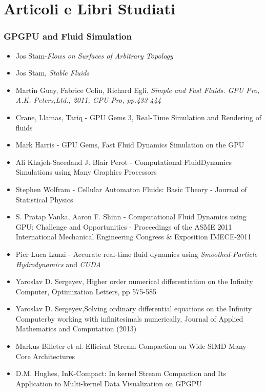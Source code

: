 \section{Articoli e Libri Studiati}
\subsubsection{GPGPU and Fluid Simulation}
\begin{itemize}
	\item  Jos Stam-\textit{Flows on Surfaces of Arbitrary Topology}
	\item Jos Stam, \textit{Stable Fluids}
	\item Martin Guay, Fabrice Colin, Richard Egli. \textit{Simple and Fast
		Fluids. GPU Pro, A.K. Peters,Ltd., 2011, GPU Pro, pp.433-444}
	\item Crane, Llamas, Tariq - GPU Gems 3, Real-Time Simulation and Rendering
	of fluids
	\item Mark Harris - GPU Gems,  Fast Fluid Dynamics Simulation on the GPU
	\item Ali Khajeh-Saeedand J. Blair Perot - Computational FluidDynamics
	Simulations using Many Graphics Processors
	\item Stephen Wolfram - Cellular Automaton Fluids: Basic Theory - Journal
	of Statistical Physics
	\item S. Pratap Vanka, Aaron F. Shinn - Computational Fluid
	Dynamics using GPU: Challenge and Opportunities - Proceedings of the ASME
	2011 International Mechanical Engineering Congress \& Exposition IMECE-2011
	\item Pier Luca Lanzi - Accurate real-time fluid dynamics
	using\textit{ Smoothed-Particle Hydrodynamics} and \textit{CUDA}
	\item Yaroslav D. Sergeyev, Higher order numerical differentiation on the
	Infinity Computer, Optimization Letters, pp 575-585
	\item Yaroslav D. Sergeyev,Solving ordinary differential equations on the
	Infinity Computerby working with infinitesimals numerically, Journal of Applied Mathematics and
	Computation (2013)
	\item Markus Billeter et al. Efficient Stream Compaction on Wide SIMD
	Many-Core Architectures
	\item D.M. Hughes, InK-Compact: In kernel Stream Compaction and Its
	Application to Multi-kernel Data Visualization on GPGPU
\end{itemize}

